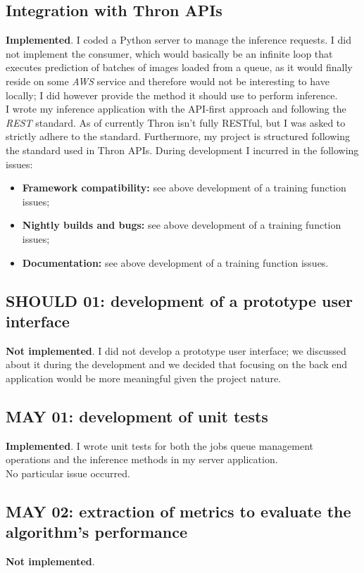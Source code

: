 \subsection{Integration with Thron APIs}
\textbf{Implemented}. I coded a Python server to manage the inference requests. I did not implement the consumer, which would basically be an infinite loop that executes prediction of batches of images loaded from a queue, as it would finally reside on some \emph{AWS} service and therefore would not be interesting to have locally; I did however provide the method it should use to perform inference. \\
I wrote my inference application with the API-first approach and following the \emph{REST} standard. As of currently Thron isn't fully RESTful, but I was asked to strictly adhere to the standard. Furthermore, my project is structured following the standard used in Thron APIs.
During development I incurred in the following issues:
\begin{itemize}
	\item \textbf{Framework compatibility:} see above development of a training function issues;
	\item \textbf{Nightly builds and bugs:} see above development of a training function issues;
	\item \textbf{Documentation:} see above development of a training function issues.
\end{itemize}

\subsection{SHOULD 01: development of a prototype user interface}
\textbf{Not implemented}. I did not develop a prototype user interface; we discussed about it during the development and we decided that focusing on the back end application would be more meaningful given the project nature.

\subsection{MAY 01: development of unit tests}
\textbf{Implemented}. I wrote unit tests for both the jobs queue management operations and the inference methods in my server application. \\
No particular issue occurred.

\subsection{MAY 02: extraction of metrics to evaluate the algorithm's performance}
\textbf{Not implemented}.


